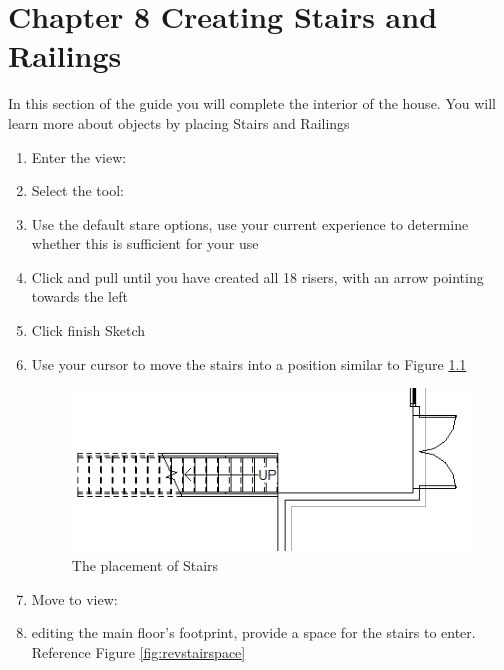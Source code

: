 \documentclass{tufte-book} %
\begin{document}
\chapter{Chapter 8 Creating Stairs and Railings}
\label{ch:8}
In this section of the guide you will complete the interior of the house. You will learn more about objects by placing Stairs and Railings
\begin{enumerate}
\section{Creating Stairs}
	\item Enter the view: 
	\item Select the tool: 
	\item Use the default stare options, use your current experience to determine whether this is sufficient for your use
	\item Click and pull until you have created all 18 risers, with an arrow pointing towards the left
	\item Click finish Sketch
	\item Use your cursor to move the stairs into a position similar to Figure \ref{fig:revstairinit}
	
	\begin{figure}
		\includegraphics[width=\linewidth]{revitstairsinit.PNG}
		\caption{The placement of Stairs}
		\label{fig:revstairinit}
	\end{figure}
	
	\item Move to view:
	\item editing the main floor's footprint, provide a space for the stairs to enter. Reference Figure \ref{fig:revstairspace}
	

\end{enumerate}
\end{document}
